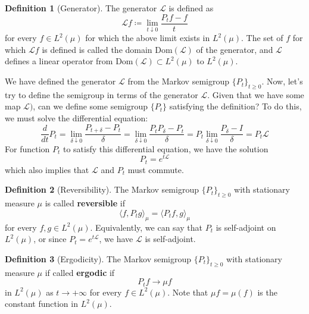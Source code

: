 \documentclass{article}
\theoremstyle{definition}
\theoremstyle{remark}
\theoremstyle{definition}
\newtheorem{definition}{Definition}[section]
\begin{document}
\begin{definition}[Generator]
The generator $\mathscr{L}$ is defined as 
\[\mathscr{L} f \coloneqq \lim_{t \downarrow 0} \frac{P_t f - f}{t}\]
for every $f \in L^2 (\mu)$ for which the above limit exists in $L^2 (\mu)$. The set of $f$ for which $\mathscr{L}f$ is defined is called the domain $\mathrm{Dom}(\mathscr{L})$ of the generator, and $\mathscr{L}$ defines a linear operator from $\mathrm{Dom}(\mathscr{L}) \subset L^2 (\mu)$ to $L^2 (\mu)$. 
\end{definition}

We have defined the generator $\mathscr{L}$ from the Markov semigroup $\{P_t\}_{t \geq 0}$. Now, let's try to define the semigroup in terms of the generator $\mathscr{L}$. Given that we have some map $\mathscr{L})$, can we define some semigroup $\{P_t\}$ satisfying the definition? To do this, we must solve the differential equation: 
\[\frac{d}{dt} P_t = \lim_{\delta \downarrow 0} \frac{P_{t + \delta} - P_t}{\delta} = \lim_{\delta \downarrow 0} \frac{P_t P_\delta - P_t}{\delta} = P_t \lim_{\delta \downarrow 0} \frac{P_\delta - I}{\delta} = P_t \mathscr{L}\]
For function $P_t$ to satisfy this differential equation, we have the solution 
\[P_t = e^{t \mathscr{L}}\]
which also implies that $\mathscr{L}$ and $P_t$ must commute. 

\begin{definition}[Reversibility]
The Markov semigroup $\{P_t\}_{t \geq 0}$ with stationary measure $\mu$ is called \textbf{reversible} if 
\[\langle f, P_t g \rangle_\mu = \langle P_t f, g \rangle_\mu\]
for every $f, g \in L^2 (\mu)$. Equivalently, we can say that $P_t$ is self-adjoint on $L^2 (\mu)$, or since $P_t = e^{t \mathscr{L}}$, we have $\mathscr{L}$ is self-adjoint. 
\end{definition}

\begin{definition}[Ergodicity]
The Markov semigroup $\{P_t\}_{t \geq 0}$ with stationary measure $\mu$ if called \textbf{ergodic} if 
\[P_t f \rightarrow \mu f\]
in $L^2 (\mu)$ as $t \rightarrow +\infty$ for every $f \in L^2 (\mu)$. Note that $\mu f = \mu(f)$ is the constant function in $L^2 (\mu)$. 
\end{definition}
\end{document}

